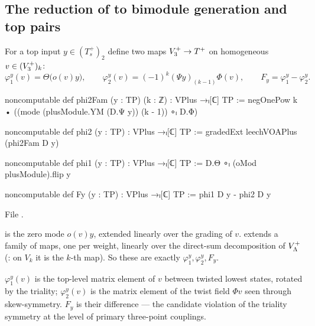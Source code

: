 \subsection{\texorpdfstring{The reduction of  to bimodule generation and top pairs}{The reduction of KeyTopV to bimodule generation and top pairs}}

For a top input $y\in(T_s^+)_2$ define two maps $V_3^{+}\to T^+$ on homogeneous $v\in(V_3^{+})_k$:
\begin{equation*}
\varphi_1^y(v)=\Theta\bigl(o(v)y\bigr),\qquad \varphi_2^y(v)=(-1)^k(\Psi y)_{(k-1)}\Phi(v),\qquad F_y=\varphi_1^y-\varphi_2^y .
\end{equation*}
\begin{definition}\label{ch14:def:Fy}
\begin{leancode}
noncomputable def phi2Fam (y : TP) (k : ℤ) : VPlus →ₗ[ℂ] TP :=
  negOnePow k • ((mode (plusModule.YM (D.Ψ y)) (k - 1)) ∘ₗ D.Φ)

noncomputable def phi2 (y : TP) : VPlus →ₗ[ℂ] TP := gradedExt leechVOAPlus (phi2Fam D y)

noncomputable def phi1 (y : TP) : VPlus →ₗ[ℂ] TP := D.Θ ∘ₗ (oMod plusModule).flip y

noncomputable def Fy (y : TP) : VPlus →ₗ[ℂ] TP := phi1 D y - phi2 D y
\end{leancode}
File .
\end{definition}

\begin{dictionary}
 is the zero mode $o(v)y$, extended linearly over the grading of $v$.
 extends a family of maps, one per weight, linearly over the direct-sum decomposition
of $V_{\Lambda}^+$ (: on $V_k$ it is the $k$-th map).  So these are exactly
$\varphi_1^y,\varphi_2^y,F_y$.
\end{dictionary}

\begin{physics}
$\varphi_1^y(v)$ is the top-level matrix element of $v$ between twisted lowest states, rotated by the
triality; $\varphi_2^y(v)$ is the matrix element of the twist field $\Phi v$ seen through skew-symmetry.
$F_y$ is their difference — the candidate violation of the triality symmetry at the level of primary
three-point couplings.
\end{physics}


